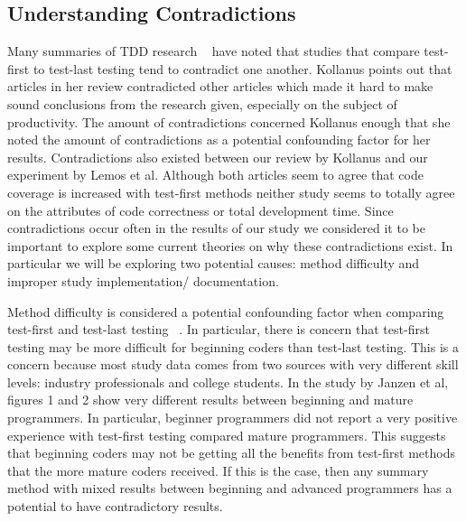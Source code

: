 \documentclass{sig-alternate}
\begin{document}
\subsection{Understanding Contradictions}
Many summaries of TDD research ~\cite{Hammond:2012, Hellman:2012, Kettunen:2010, Kollanus:2010} have noted that studies that compare test-first to test-last testing tend to contradict one another.  Kollanus points out that articles in her review contradicted other articles which made it hard to make sound conclusions from the research given, especially on the subject of productivity.  The amount of contradictions concerned Kollanus enough that she noted the amount of contradictions as a potential confounding factor for her results.  Contradictions also existed between our review by Kollanus and our experiment by Lemos et al.  Although both articles seem to agree that code coverage is increased with test-first methods neither study seems to totally agree on the attributes of code correctness or total development time.  Since contradictions occur often in the results of our study we considered it to be important to explore some current theories on why these contradictions exist.  In particular we will be exploring two potential causes: method difficulty and improper study implementation/ documentation.

Method difficulty is considered a potential confounding factor when comparing test-first and test-last testing ~\cite{Hammond:2012, Kettunen:2010}. In particular, there is concern that test-first testing may be more difficult for beginning coders than test-last testing.  This is a concern because most study data comes from two sources with very different skill levels: industry professionals and college students.  In the study by Janzen et al, figures 1 and 2 show very different results between beginning and mature programmers.  In particular, beginner programmers did not report a very positive experience with test-first testing compared mature programmers.  This suggests that beginning coders may not be getting all the benefits from test-first methods that the more mature coders received.  If this is the case, then any summary method with mixed results between beginning and advanced programmers has a potential to have contradictory results.
\end{document}
